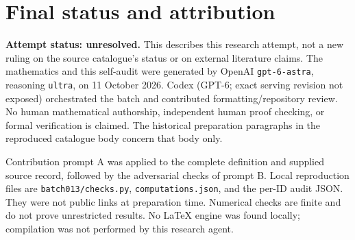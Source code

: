 \documentclass[11pt]{article}
\begin{document}
\section{Final status and attribution}
\textbf{Attempt status: unresolved.} This describes this research attempt, not a new ruling on the source catalogue's status or on external literature claims.
The mathematics and this self-audit were generated by OpenAI \texttt{gpt-6-astra}, reasoning \texttt{ultra}, on 11 October 2026. Codex (GPT-6; exact serving revision not exposed) orchestrated the batch and contributed formatting/repository review. No human mathematical authorship, independent human proof checking, or formal verification is claimed. The historical preparation paragraphs in the reproduced catalogue body concern that body only.

Contribution prompt A was applied to the complete definition and supplied source record, followed by the adversarial checks of prompt B. Local reproduction files are \texttt{batch013/checks.py}, \texttt{computations.json}, and the per-ID audit JSON. They were not public links at preparation time. Numerical checks are finite and do not prove unrestricted results. No LaTeX engine was found locally; compilation was not performed by this research agent.
\end{document}

